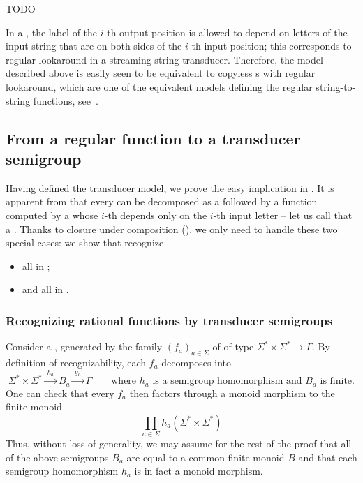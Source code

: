 \begin{example}
  TODO
\end{example}

In a , the label of the $i$-th output position is allowed to depend on letters of the input string that are on both sides of the $i$-th input position; this corresponds to regular lookaround in a streaming string transducer. Therefore, the model described above is easily seen to be equivalent to copyless \sst{}s with regular lookaround, which are one of the equivalent models defining the regular string-to-string functions, see~\cite[Section~IV.C]{AlurFT12}.

\subsection{From a regular function to a transducer semigroup}
\label{sec:easy}

\AP Having defined the transducer model, we prove the easy implication in
. It is apparent from  that every
 can be decomposed as a  followed by a function
computed by a  whose $i$-th  depends
only on the $i$-th input letter -- let us call that a  \sst. Thanks
to closure under composition (), we only need to handle
these two special cases: we show that   recognize
\begin{itemize}
\item all  in ;
\item and all   in .
\end{itemize}

\subsubsection{Recognizing rational functions by transducer semigroups}
\label{sec:rational}

Consider a , generated by the family $(f_a)_{a\in\Sigma}$ of  of type
$\Sigma^* \times \Sigma^* \to \Gamma$. By
definition of recognizability, each $f_a$ decomposes into
\[ \Sigma^* \times \Sigma^* \xrightarrow{\;h_a\;} B_a \xrightarrow{\;g_a\;} \Gamma
  \qquad\text{where $h_a$ is a semigroup homomorphism and $B_a$ is finite.} \]
One can check that every $f_a$ then factors through a monoid morphism to the
finite monoid
\[ \prod_{a \in \Sigma} h_a(\Sigma^* \times \Sigma^*) \]
Thus, without loss of generality, we may assume for the rest of the proof that
all of the above semigroups $B_a$ are equal to a common finite monoid $B$ and
that each semigroup homomorphism $h_a$ is in fact a monoid morphism.

